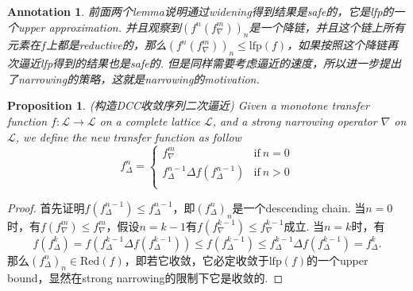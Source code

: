 \documentclass{article}
\newtheorem{proposition}[theorem]{Proposition}
\newtheorem{annotation}[theorem]{Annotation}
\newcommand*{\xfunc}[4]{{#2}\colon{#3}{#1}{#4}}
\newcommand*{\func}[3]{\xfunc{\to}{#1}{#2}{#3}}
\begin{document}
\begin{annotation} \rm
前面两个lemma说明通过widening得到结果是safe的，它是lfp的一个upper approximation. 并且观察到$(f^n(f^m_\nabla))_n$是一个降链，并且这个链上所有元素在$f$上都是reductive的，那么$(f^n(f^m_\nabla))_n \leq \text{lfp}(f)$，如果按照这个降链再次逼近lfp得到的结果也是safe的. 但是同样需要考虑逼近的速度，所以进一步提出了narrowing的策略，这就是narrowing的motivation.
\end{annotation}

\begin{proposition}
\rm {\color{red}(构造DCC收敛序列二次逼近)} Given a monotone transfer function $\func{f}{\mathcal{L}}{\mathcal{L}}$ on a complete lattice $\mathcal{L}$, and a strong narrowing operator $\nabla$ on $\mathcal{L}$, we define the new transfer function as follow
$$
f^n_\Delta = \left\{ \begin{array}{ll} 
f^m_\nabla & \text{if}~n = 0 \\
f^{n-1}_\Delta \Delta f(f^{n-1}_\Delta) & \text{if}~n > 0\\
\end{array} \right.
$$
\end{proposition}

\begin{proof}
首先证明$f(f^{n-1}_\Delta) \leq f^{n-1}_\Delta$，即$(f^{n}_\Delta)_n$是一个descending chain. 当$n=0$时，有$f(f^m_\nabla) \leq f^m_\nabla$，假设$n=k-1$有$f(f^{k-1}_\nabla) \leq f^{k-1}_\nabla$成立. 当$n=k$时，有
$$
f(f^k_\Delta)= f(f^{k-1}_\Delta \Delta f(f^{k-1}_\Delta)) \leq f(f^{k-1}_\Delta) \leq f^{k-1}_\Delta \Delta f(f^{k-1}_\Delta) = f^k_\Delta.
$$
那么$(f^{n}_\Delta)_n \in \text{Red}(f)$，即若它收敛，它必定收敛于$\text{lfp}(f)$的一个upper bound，显然在strong narrowing的限制下它是收敛的. 
\end{proof}
\end{document}
